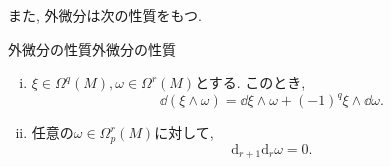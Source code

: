 \documentclass[../main.tex]{subfiles}
\begin{document}
    また, 外微分は次の性質をもつ.
    \begin{prop}{外微分の性質}{外微分の性質}
        \begin{enumerate}[(i)]
            \item $\xi\in\Omega^q(M), \omega\in\Omega^r(M)$とする. このとき,
                    \begin{equation}
                        \dd(\xi \wedge \omega)
                            = \dd{\xi}\wedge\omega
                                + (-1)^{q}\xi\wedge\dd{\omega}.
                    \end{equation}
            \item 任意の$\omega\in\Omega_p^r(M)$に対して,
                \begin{equation}
                    \mathrm{d}_{r+1} \mathrm{d}_r \omega = 0.
                \end{equation}
        \end{enumerate}
    \end{prop}
\end{document}
